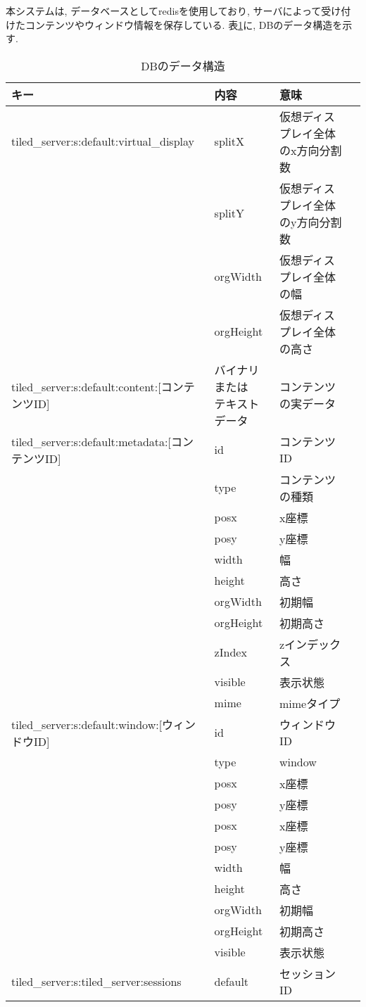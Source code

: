 \documentclass[a4paper,10pt,oneside]{jsbook}
\begin{document}
本システムは, データベースとしてredisを使用しており, サーバによって受け付けたコンテンツやウィンドウ情報を保存している. 表\ref{dbstructure}に, DBのデータ構造を示す.
\begin{table}[htbp]
\begin{center}
\caption{DBのデータ構造}
\label{dbstructure}
\begin{tabular}{|l|l|l|l|}
\hline
キー	& 内容 & 意味 \\
\hline
\hline
tiled\_server:s:default:virtual\_display & splitX & 仮想ディスプレイ全体のx方向分割数 \\
　	& splitY	 &仮想ディスプレイ全体のy方向分割数 \\
　	& orgWidth & 仮想ディスプレイ全体の幅 \\
　	& orgHeight & 仮想ディスプレイ全体の高さ \\
\hline
tiled\_server:s:default:content:[コンテンツID] & \shortstack[l]{バイナリまたは\\テキストデータ}	& コンテンツの実データ \\
\hline
tiled\_server:s:default:metadata:[コンテンツID] & id & コンテンツID \\
　	& type & コンテンツの種類 \\
　	& posx & x座標 \\
　	& posy & y座標 \\
　	& width & 幅 \\
　	& height & 高さ \\
　	& orgWidth &初期幅 \\
　	& orgHeight & 初期高さ \\
　	& zIndex & zインデックス \\
　	& visible & 表示状態 \\
　	& mime & 	mimeタイプ \\
\hline
tiled\_server:s:default:window:[ウィンドウID] & id & ウィンドウID \\
　	& type & window \\
　	& posx &  x座標 \\
　	& posy & 	y座標 \\
　	& posx & 	x座標 \\
　	& posy & 	y座標 \\
　	& width & 	幅 \\
　	& height & 	高さ \\
　	& orgWidth & 	初期幅 \\
　	& orgHeight & 	初期高さ \\
　	& visible & 	表示状態 \\
\hline
tiled\_server:s:tiled\_server:sessions & default & セッションID \\
\hline

\end{tabular}
\end{center}
\end{table}
\end{document}
